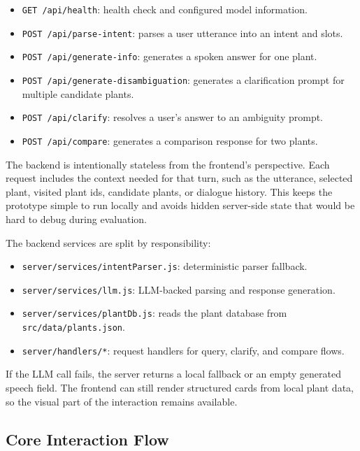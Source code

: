 \documentclass[12pt,a4paper]{article}
\begin{document}
\begin{itemize}
    \item \texttt{GET /api/health}: health check and configured model information.
    \item \texttt{POST /api/parse-intent}: parses a user utterance into an intent
    and slots.
    \item \texttt{POST /api/generate-info}: generates a spoken answer for one
    plant.
    \item \texttt{POST /api/generate-disambiguation}: generates a clarification
    prompt for multiple candidate plants.
    \item \texttt{POST /api/clarify}: resolves a user's answer to an ambiguity
    prompt.
    \item \texttt{POST /api/compare}: generates a comparison response for two
    plants.
\end{itemize}

The backend is intentionally stateless from the frontend's perspective. Each
request includes the context needed for that turn, such as the utterance,
selected plant, visited plant ids, candidate plants, or dialogue history. This
keeps the prototype simple to run locally and avoids hidden server-side state
that would be hard to debug during evaluation.

The backend services are split by responsibility:

\begin{itemize}
    \item \texttt{server/services/intentParser.js}: deterministic parser fallback.
    \item \texttt{server/services/llm.js}: LLM-backed parsing and response generation.
    \item \texttt{server/services/plantDb.js}: reads the plant database from
    \texttt{src/data/plants.json}.
    \item \texttt{server/handlers/*}: request handlers for query, clarify, and
    compare flows.
\end{itemize}

If the LLM call fails, the server returns a local fallback or an empty generated
speech field. The frontend can still render structured cards from local plant
data, so the visual part of the interaction remains available.

\subsection{Core Interaction Flow}
\end{document}
